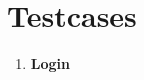 \pagebreak
\section{Testcases}

\begin{centering}
\begin{enumerate}
\item \textbf{Login}\\
\begin{supertabular*}{\textwidth}{p{0.2\textwidth} p{0.8\textwidth} } 
	
\end{supertabular*}

\end{enumerate}
\end{centering}